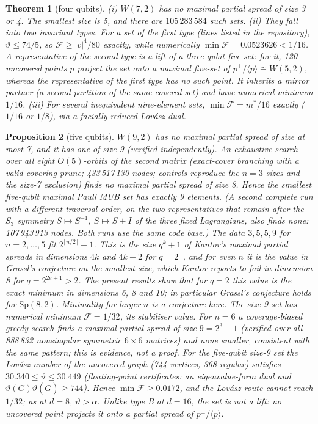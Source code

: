 \documentclass[11pt]{article}
\newtheorem{theorem}{Theorem}
\newtheorem{proposition}[theorem]{Proposition}
\theoremstyle{remark}\newtheorem*{remark}{Remark}
\newcommand{\F}{\mathcal{F}}
\begin{document}
\begin{theorem}[four qubits]\label{t:4}
(i) $W(7,2)$ has no maximal partial spread of size 3 or 4. The smallest size is 5, and there are $105\,283\,584$ such sets.
(ii) They fall into two invariant types. For a set of the first type (lines listed in the repository), $\vartheta\le74/5$, so
$\F\ge|v|^4/80$ exactly, while numerically $\min\F=0.0523626<1/16$. A representative of the second type is a \emph{lift} of a three-qubit five-set: for it, 120
uncovered points $p$ project the set onto a maximal five-set of $p^\perp/\langle p\rangle\cong W(5,2)$, whereas the representative of
the first type has no such point. It inherits a mirror partner (a second partition of the same covered set) and have numerical minimum $1/16$.
(iii) For several inequivalent nine-element sets, $\min\F=m^*/16$ exactly ($1/16$ or $1/8$), via a facially reduced Lovász dual.
\end{theorem}
\begin{proposition}[five qubits]
$W(9,2)$ has no maximal partial spread of size at most 7, and it has one of size 9 (verified independently). An exhaustive search over all eight $O(5)$-orbits of the second matrix (exact-cover branching with a valid covering prune;
433\,517\,130 nodes; controls reproduce the $n=3$ sizes and the size-7 exclusion) finds no maximal partial spread of size 8. Hence the
smallest five-qubit maximal Pauli MUB set has exactly 9 elements. (A second complete run with a different traversal order, on the two representatives that remain after the $S_3$ symmetry $S\mapsto S^{-1}$, $S\mapsto S+I$ of the three fixed Lagrangians, also finds none: 107\,943\,913 nodes. Both runs use the same code base.) The data $3,5,5,9$ for $n=2,\dots,5$ fit $2^{\lceil n/2\rceil}+1$. This is the size $q^k+1$ of Kantor's maximal partial spreads in dimensions $4k$ and $4k-2$ for $q=2$~\cite{kantor}, and for even $n$ it is the value in Grassl's conjecture on the smallest size, which Kantor reports to fail in dimension 8 for $q=2^{2e+1}>2$. The present results show that for $q=2$ this value is the exact minimum in dimensions 6, 8 and 10; in particular Grassl's conjecture holds for $\mathrm{Sp}(8,2)$. Minimality for larger $n$ is a conjecture here. The size-9 set has numerical minimum $\F=1/32$, its stabiliser value. For $n=6$ a coverage-biased greedy search finds a maximal
partial spread of size $9=2^{3}+1$ (verified over all 888\,832 nonsingular symmetric $6\times6$ matrices) and none smaller, consistent
with the same pattern; this is evidence, not a proof. For the five-qubit size-9 set the Lovász number of the uncovered graph (744
vertices, 368-regular) satisfies $30.340\le\vartheta\le30.449$ (floating-point certificates: an eigenvalue-form dual and
$\vartheta(G)\vartheta(\bar G)\ge744$). Hence $\min\F\ge0.0172$, and the Lovász route cannot reach $1/32$; as at $d=8$, $\vartheta>\alpha$.
Unlike type B at $d=16$, the set is not a lift: no uncovered point projects it onto a partial spread of $p^\perp/\langle p\rangle$.
\end{proposition}
\end{document}
